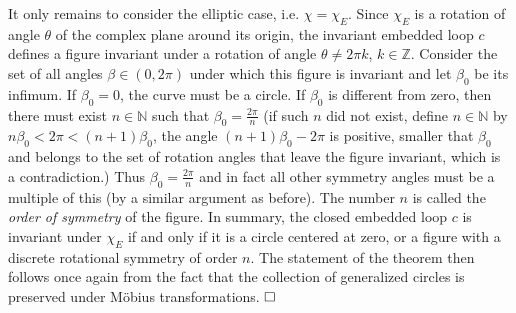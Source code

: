 It only remains to consider the elliptic case, i.e. $\chi = \chi_E$.
Since $\chi_E$ is a rotation of angle $\theta$
of the complex plane around its origin, the invariant embedded loop $c$
defines a figure invariant under a rotation of angle $\theta \neq 2 \pi k$,
$k \in \mathbb{Z}$.
Consider the set of all angles $\beta \in (0,2\pi)$
under which this figure is invariant
and let $\beta_0$ be its infimum. If $\beta_0 =0$, the curve
must be a circle. If $\beta_0$ is different from zero, then there must exist 
$n \in \mathbb{N}$ such that $\beta_0 = \frac{2\pi}{n}$ (if such $n$
did not exist, define $n \in \mathbb{N}$ by
$n \beta_0 <2\pi < (n+1) \beta_0 $,  the angle $(n+1) \beta_0
- 2\pi$ is positive, smaller that $\beta_0$ and belongs to the set
of rotation angles that leave the figure invariant, which is a contradiction.)
Thus $\beta_0 = \frac{2\pi}{n}$ and in fact all other symmetry angles
must be a multiple of this (by a similar argument as before).
The number $n$ is called the {\it order of symmetry} of the figure.
In summary, the closed embedded loop $c$ is invariant under $\chi_E$
if and only if it is a circle centered at zero, or a figure with a discrete
rotational symmetry of order $n$. The statement of the theorem then follows
once again from the fact that the collection of generalized circles is preserved
under M\"obius transformations. $\hfill \Box$

\vspace{5mm}

